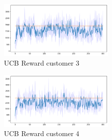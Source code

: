 \begin{multicols}{2}
    \begin{figure}[H]
        \begin{center}
        \includegraphics[width=0.5\textwidth]{img/ucb7_3.png}
        \caption{UCB Reward customer 3}
        \label{fig:reward73}
        \end{center}
    \end{figure}
    \columnbreak
    \begin{figure}[H]
        \begin{center}
        \includegraphics[width=0.5\textwidth]{img/ucb7_4.png}
        \caption{UCB Reward customer 4}
        \label{fig:reward74}
        \end{center}
    \end{figure}
\end{multicols}

